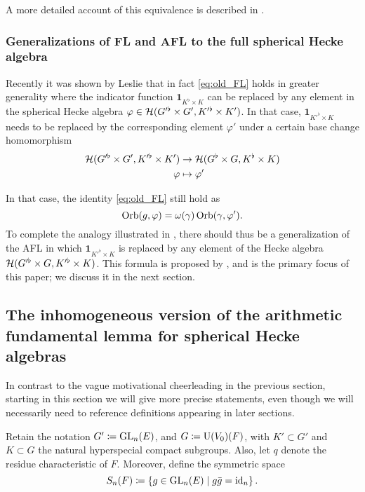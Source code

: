 A more detailed account of this equivalence is described in \cite[\S1.4]{ref:liuFJ}.

\subsubsection{Generalizations of FL and AFL to the full spherical Hecke algebra}
Recently it was shown by Leslie \cite{ref:leslie} that in fact
\eqref{eq:old_FL} holds in greater generality where the indicator function
$\mathbf{1}_{K^\flat \times K}$ can be replaced by any element in the spherical
Hecke algebra $\varphi \in \mathcal H(G'^\flat \times G', K'^\flat \times K')$.
In that case, $\mathbf{1}_{K'^\flat \times K}$ needs to be replaced
by the corresponding element $\varphi'$ under a certain base change homomorphism
\begin{align*}
  \mathcal H(G'^\flat \times G', K'^\flat \times K') &\to \mathcal H(G^\flat \times G, K^\flat \times K) \\
  \varphi &\mapsto \varphi'
\end{align*}

In that case, the identity \eqref{eq:old_FL} still hold as
\begin{equation}
  \operatorname{Orb}(g, \varphi) = \omega(\gamma) \operatorname{Orb}(\gamma, \varphi').
  \label{eq:eq:leslie_FL}
\end{equation}
To complete the analogy illustrated in ,
there should thus be a generalization of the AFL in which
$\mathbf{1}_{K'^\flat \times K}$ is replaced by any element of the Hecke algebra
$\mathcal H(G'^\flat \times G, K'^\flat \times K)$.
This formula is proposed by \cite{ref:AFLspherical},
and is the primary focus of this paper; we discuss it in the next section.

\subsection{The inhomogeneous version of the arithmetic fundamental lemma for spherical Hecke algebras}
In contrast to the vague motivational cheerleading in the previous section,
starting in this section we will give more precise statements,
even though we will necessarily need to reference definitions appearing in later sections.

Retain the notation $G' \coloneqq \operatorname{GL}_n(E)$, and $G \coloneqq \operatorname{U}(V_0)(F)$,
with $K' \subset G'$ and $K \subset G$ the natural hyperspecial compact subgroups.
Also, let $q$ denote the residue characteristic of $F$.
Moreover, define the symmetric space
\[ S_n(F) \coloneqq \left\{ g \in \operatorname{GL}_n(E) \mid g \bar{g} = \operatorname{id}_n \right\}. \]

